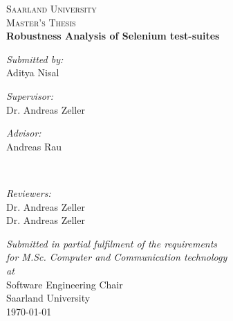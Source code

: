 \documentclass[12pt, a4paper, twoside]{Thesis} %
\begin{document}
\begin{titlepage}
\begin{center}

\textsc{\LARGE Saarland University}\\[1.5cm] %
\textsc{\Large Master's Thesis}\\[0.5cm] %

\vspace{1cm}
{\huge \bfseries Robustness Analysis of Selenium test-suites}\\[0.4cm] %
\vspace{1cm}
\begin{center}
\emph{Submitted by:}\\
{Aditya Nisal} 
\end{center}
\vspace{2cm}
\begin{minipage}{0.4\textwidth}
\begin{flushleft} 
\emph{Supervisor:}\\
{Dr. Andreas Zeller} %

\end{flushleft}
\end{minipage}
\begin{minipage}{0.4\textwidth}
\begin{flushright} 
\emph{Advisor:} \\
{Andreas Rau} %
\end{flushright}
\end{minipage}\\[1cm]


\begin{center}
\emph{Reviewers:}\\
{Dr. Andreas Zeller}\\
{Dr. Andreas Zeller}
\end{center}

\vspace{1.5cm}
\large \textit{Submitted in partial fulfilment of the requirements\\ for M.Sc. Computer and Communication technology}\\[0.3cm] %
\textit{at}\\[0.4cm]
Software Engineering Chair \\Saarland University\\[1cm] %
 
{\large \today}\\[1cm] %
 
\vfill
\end{center}

\end{titlepage}
\end{document}
